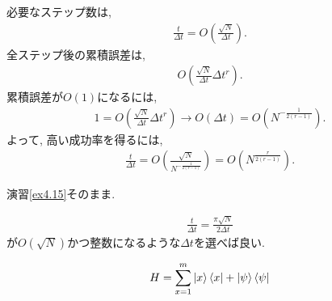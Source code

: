 \begin{ex}
    \label{ex6.8}
    必要なステップ数は,
    \begin{align*}
        \frac{t}{\Delta t} = O \left( \frac{\sqrt{N}}{\Delta t}\right).
    \end{align*}
    全ステップ後の累積誤差は,
    \begin{align*}
        O \left( \frac{\sqrt{N}}{\Delta t} \Delta t ^r\right).
    \end{align*}
    累積誤差が$O(1)$になるには,
    \begin{align*}
        1 = O  \left( \frac{\sqrt{N}}{\Delta t} \Delta t^r\right)
        \to O \left( \Delta t\right) = O \left( N^{ - \frac{1}{2(r-1)}}\right).
    \end{align*}
    よって, 高い成功率を得るには,
    \begin{align*}
        \frac{t}{\Delta t}
        = O \left( \frac{\sqrt{N}}{N^{ - \frac{1}{2(r-1)}} }\right)
        = O \left( N^{\frac{r}{2(r-1)}}\right).
    \end{align*}
\end{ex}

\begin{ex}
    \label{ex6.9}
    演習\ref{ex4.15}そのまま.
\end{ex}

\begin{ex}
    \label{ex6.10}
    \begin{align*}
        \frac{t}{\Delta t } = \frac{\pi \sqrt{N}}{2 \Delta t}
    \end{align*}
    が$O(\sqrt{N})$かつ整数になるような$\Delta t$を選べば良い.
\end{ex}

\begin{ex}
    \label{ex6.11}
    \begin{align*}
        H = \sum_{x =1}^m \ket{x}\bra{x} + \ket{\psi}\bra{\psi}
    \end{align*}
\end{ex}

